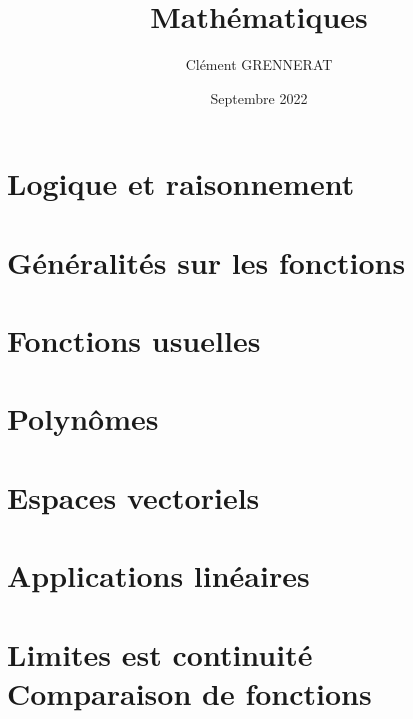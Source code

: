 \documentclass[13pt, twoside, a4paper, french]{report}
\newcommand*{\getSubject}{Mathématiques}
\begin{document}
    \title{\getSubject}
    \author{Clément GRENNERAT}
    \date{Septembre 2022}
    \pagestyle{non-chapter-style}


    \chapter{Logique et raisonnement}\label{ch:logique-et-raisonnement}
    


    \chapter{Généralités sur les fonctions}\label{ch:generalites-sur-les-fonctions}
    


    \chapter{Fonctions usuelles}\label{ch:fonctions-usuelles}
    


    \chapter{Polynômes}\label{ch:polynomes}
    


    \chapter{Espaces vectoriels}\label{ch:espaces-vectoriels}
    


    \chapter{Applications linéaires}\label{ch:applications-lineaires}
    


    \chapter{Limites est continuité\\Comparaison de fonctions}\label{ch:limites-est-continuite---comparaison-de-fonctions}
    
\end{document}
